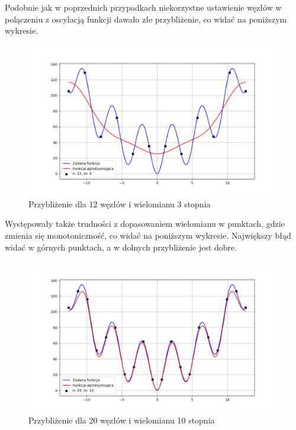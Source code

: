 \documentclass{article}
\begin{document}
Podobnie jak w poprzednich przypadkach niekorzystne ustawienie węzłów w polączeniu z oscylacją funkcji dawało złe przybliżenie, co widać na poniższym wykresie.

\begin{figure}[H]
\centering
  \begin{minipage}[b]{0.49\textwidth}
    \includegraphics[width=\textwidth]{img29_n=12_m=3.png}
    \caption{Przybliżenie dla 12 węzłów i wielomianu 3 stopnia}
  \end{minipage}
\end{figure}

\newpage

Występowały także trudności z dopasowaniem wielomianu w punktach, gdzie zmienia się monotoniczność, co widać na poniższym wykresie. Największy błąd widać w górnych punktach, a w dolnych przybliżenie jest dobre.

\begin{figure}[H]
\centering
  \begin{minipage}[b]{0.49\textwidth}
    \includegraphics[width=\textwidth]{img29_n=20_m=10.png}
    \caption{Przybliżenie dla 20 węzłów i wielomianu 10 stopnia}
  \end{minipage}
\end{figure}
\end{document}
